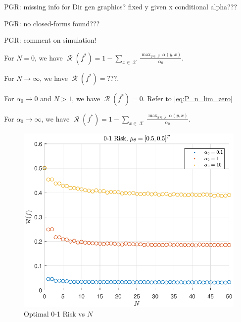 \documentclass[12pt]{report}
\DeclareMathOperator{\Xcal}{\mathcal{X}}
\DeclareMathOperator{\Ycal}{\mathcal{Y}}
\DeclareMathOperator{\Rcal}{\mathcal{R}}
\begin{document}
PGR: missing info for Dir gen graphics? fixed y given x conditional alpha???

PGR: no closed-forms found???


PGR: comment on simulation!

For $N = 0$, we have $\Rcal(f^*) = 1 - \sum_{x \in \Xcal} \frac{\max_{y \in \Ycal} \alpha(y,x)}{\alpha_0}$. 

For $N \to \infty$, we have $\Rcal(f^*) = ???$.

For $\alpha_0 \to 0$ and $N > 1$, we have $\Rcal(f^*) = 0$. Refer to \ref{eq:P_n_lim_zero}

For $\alpha_0 \to \infty$, we have $\Rcal(f^*) = 1 - \sum_{x \in \Xcal} \frac{\max_{y \in \Ycal} \alpha(y,x)}{\alpha_0}$.



\begin{figure}
\centering
\includegraphics[scale=1.0]{Risk_01_Dir_N.pdf}
\caption{Optimal 0-1 Risk vs $N$}
\label{fig:Risk_01_Dir_N}
\end{figure}
\end{document}
